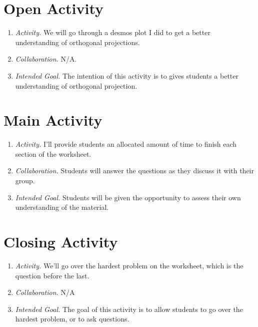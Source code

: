\documentclass[11pt]{article}
\begin{document}
\newpage
{}
\section{\centering Open Activity}
	\begin{enumerate}
		\item \textit{Activity.} We will go through a desmos plot I did to get a better understanding of orthogonal projections.
		\item \textit{Collaboration.} N/A.
		\item \textit{Intended Goal.} The intention of this activity is to gives students a better understanding of orthogonal projection.
	\end{enumerate}

\section{\centering Main Activity}
	\begin{enumerate}
		\item \textit{Activity.} I'll provide students an allocated amount of time to finish each section of the worksheet.
		\item \textit{Collaboration.} Students will answer the questions as they discuss it with their group.
		\item \textit{Intended Goal.} Students will be given the opportunity to assess their own understanding of the material.
	\end{enumerate}
\section{\centering Closing Activity}
	\begin{enumerate}
		\item \textit{Activity.} We'll go over the hardest problem on the worksheet, which is the question before the last.
		\item \textit{Collaboration.} N/A
		\item \textit{Intended Goal.} The goal of this activity is to allow students to go over the hardest problem, or to ask questions.
	\end{enumerate}
\end{document}
